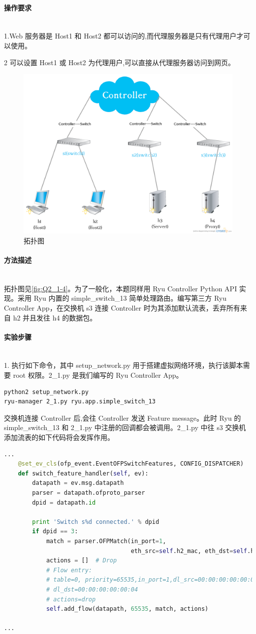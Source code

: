 \documentclass[format=draft,language=chinese,category=SDN]{hustreport}
\newcommand{\myparagraph}[1]{\paragraph{#1}\mbox{}\\}
\begin{document}
\myparagraph{操作要求}

1.Web 服务器是 Host1 和 Host2 都可以访问的,而代理服务器是只有代理用户才可以使用。

2 可以设置 Host1 或 Host2 为代理用户,可以直接从代理服务器访问到网页。

\begin{figure}[!h]
\centering
\includegraphics[width=.618\textwidth]{fig/2_1-4.png}
\caption{拓扑图}\label{fig:Q2_1-4}
\end{figure}

\myparagraph{方法描述}

拓扑图见\autoref{fig:Q2_1-4}。为了一般化，本题同样用 Ryu Controller Python API 实现。采用 Ryu 内置的 simple\_switch\_13 简单处理路由。编写第三方 Ryu Controller App，在交换机 s3 连接 Controller 时为其添加默认流表，丢弃所有来自 h2 并且发往 h4 的数据包。

\myparagraph{实验步骤}

1. 执行如下命令，其中 setup\_network.py 用于搭建虚拟网络环境，执行该脚本需要 root 权限。2\_1.py 是我们编写的 Ryu Controller App。

\begin{lstlisting}
python2 setup_network.py
ryu-manager 2_1.py ryu.app.simple_switch_13
\end{lstlisting}

交换机连接 Controller 后,会往 Controller 发送 Feature message。此时 Ryu 的 simple\_switch\_13 和 2\_1.py 中注册的回调都会被调用。2\_1.py 中往 s3 交换机添加流表的如下代码将会发挥作用。

\begin{lstlisting}[language=python]
...
    @set_ev_cls(ofp_event.EventOFPSwitchFeatures, CONFIG_DISPATCHER)
    def switch_feature_handler(self, ev):
        datapath = ev.msg.datapath
        parser = datapath.ofproto_parser
        dpid = datapath.id

        print 'Switch s%d connected.' % dpid
        if dpid == 3:
            match = parser.OFPMatch(in_port=1,
                                    eth_src=self.h2_mac, eth_dst=self.h4_mac)
            actions = []  # Drop
            # Flow entry:
            # table=0, priority=65535,in_port=1,dl_src=00:00:00:00:00:02,
            # dl_dst=00:00:00:00:00:04
            # actions=drop
            self.add_flow(datapath, 65535, match, actions)

...
\end{lstlisting}
\end{document}
